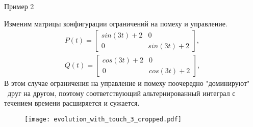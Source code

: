 \documentclass{beamer}
\begin{document}
\begin{frame}{Пример 2}
  \begin{minipage}{0.45\textwidth}
  Изменим матрицы конфигурации ограничений на помеху и управление.
    \begin{gather*}
        P(t) = \begin{bmatrix}
            sin(3t) + 2 & 0 \\[0.3em]
            0 & sin(3t) + 2
        \end{bmatrix}, \\
        Q(t) = \begin{bmatrix}
            cos(3t) + 2 & 0 \\[0.3em]
            0 & cos(3t) + 2
        \end{bmatrix},
    \end{gather*}
    В этом случае ограничения на управление и помеху поочередно "доминируют" \ друг на другом, поэтому соответствующий альтернированный  интеграл с течением времени расширяется и сужается.
  \end{minipage} \hfill
  \begin{minipage}{0.5\textwidth}
      \begin{figure}
        \texttt{[image: evolution\_with\_touch\_3\_cropped.pdf]}
      \end{figure}
  \end{minipage}
 
\end{frame}
\end{document}
